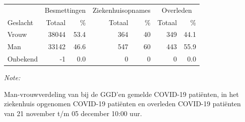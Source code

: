 \documentclass[
  english,
  man,floatsintext]{apa6}
\begin{document}
\begin{table}[H]
\centering\begingroup\fontsize{11}{13}\selectfont

\begin{threeparttable}
\begin{tabular}{lrrrrrr}
\toprule
\multicolumn{1}{c}{ } & \multicolumn{2}{c}{Besmettingen} & \multicolumn{2}{c}{Ziekenhuisopnames} & \multicolumn{2}{c}{Overleden} \\
\cmidrule(l{3pt}r{3pt}){2-3} \cmidrule(l{3pt}r{3pt}){4-5} \cmidrule(l{3pt}r{3pt}){6-7}
Geslacht & Totaal & \% & Totaal & \% & Totaal & \%\\
\midrule
Vrouw & 38044 & 53.4 & 364 & 40 & 349 & 44.1\\
Man & 33142 & 46.6 & 547 & 60 & 443 & 55.9\\
Onbekend & -1 & 0.0 & 0 & 0 & 0 & 0.0\\
\bottomrule
\end{tabular}
\begin{tablenotes}
\item \textit{Note: } 
\item Man-vrouwverdeling van bij de GGD’en gemelde COVID-19 patiënten, in het ziekenhuis opgenomen COVID-19 patiënten en overleden COVID-19 patiënten van 21 november t/m 05 december 10:00 uur.
\end{tablenotes}
\end{threeparttable}
\endgroup{}
\end{table}
\newpage
\end{document}
